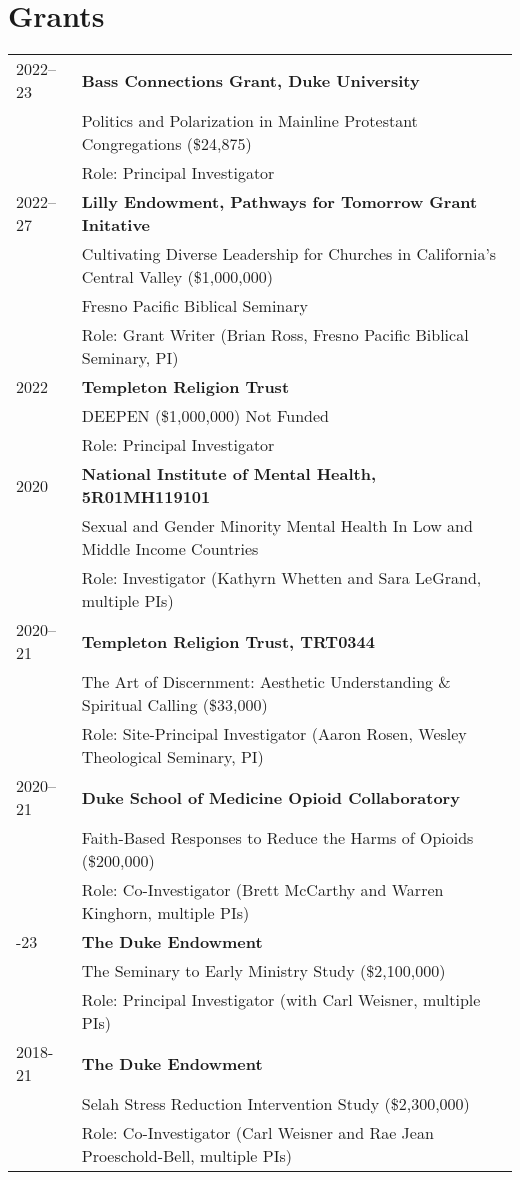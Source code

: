 \section*{Grants}
\begin{longtable}{p{} p{}}
2022--23 & \textbf{Bass Connections Grant, Duke University}\\
& Politics and Polarization in Mainline Protestant Congregations (\$24,875)\\
& Role: Principal Investigator\\
2022--27 & \textbf{Lilly Endowment, Pathways for Tomorrow Grant Initative} \\
& Cultivating Diverse Leadership for Churches in California’s Central Valley (\$1,000,000)\\
& Fresno Pacific Biblical Seminary\\
& Role: Grant Writer (Brian Ross, Fresno Pacific Biblical Seminary, PI)\\
2022 & \textbf{Templeton Religion Trust} \\
	& DEEPEN (\$1,000,000) Not Funded \\
	& Role: Principal Investigator\\
2020 & \textbf{National Institute of Mental Health, 5R01MH119101} \\
& Sexual and Gender Minority Mental Health In Low and Middle Income Countries \\
& Role: Investigator (Kathyrn Whetten and Sara LeGrand, multiple PIs)\\

2020--21 & \textbf{Templeton Religion Trust, TRT0344} \\
& The Art of Discernment: Aesthetic Understanding \& Spiritual Calling (\$33,000)\\
& Role: Site-Principal Investigator (Aaron Rosen, Wesley Theological Seminary, PI)\\

2020--21 & \textbf{Duke School of Medicine Opioid Collaboratory}\\
& Faith-Based Responses to Reduce the Harms of Opioids (\$200,000) \\
& Role: Co-Investigator (Brett McCarthy and Warren Kinghorn, multiple PIs)\\
\newpage
2018-23 & \textbf{The Duke Endowment}\\
& The Seminary to Early Ministry Study (\$2,100,000)\\
& Role: Principal Investigator (with Carl Weisner, multiple PIs)\\
\vspace{.2em}
2018-21 & \textbf{The Duke Endowment}\\
& Selah Stress Reduction Intervention Study (\$2,300,000)\\
& Role: Co-Investigator (Carl Weisner and Rae Jean Proeschold-Bell, multiple PIs)\\


\end{longtable}
